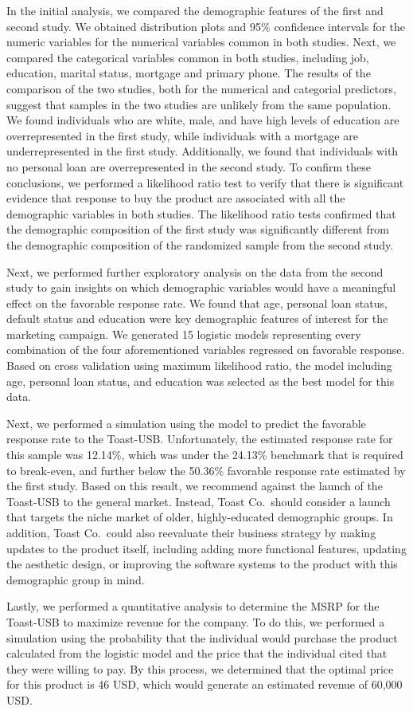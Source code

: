 \documentclass[]{article}
\begin{document}
In the initial analysis, we compared the demographic features of the
first and second study. We obtained distribution plots and 95\%
confidence intervals for the numeric variables for the numerical
variables common in both studies. Next, we compared the categorical
variables common in both studies, including job, education, marital
status, mortgage and primary phone. The results of the comparison of the
two studies, both for the numerical and categorial predictors, suggest
that samples in the two studies are unlikely from the same population.
We found individuals who are white, male, and have high levels of
education are overrepresented in the first study, while individuals with
a mortgage are underrepresented in the first study. Additionally, we
found that individuals with no personal loan are overrepresented in the
second study. To confirm these conclusions, we performed a likelihood
ratio test to verify that there is significant evidence that response to
buy the product are associated with all the demographic variables in
both studies. The likelihood ratio tests confirmed that the demographic
composition of the first study was significantly different from the
demographic composition of the randomized sample from the second study.

Next, we performed further exploratory analysis on the data from the
second study to gain insights on which demographic variables would have
a meaningful effect on the favorable response rate. We found that age,
personal loan status, default status and education were key demographic
features of interest for the marketing campaign. We generated 15
logistic models representing every combination of the four
aforementioned variables regressed on favorable response. Based on cross
validation using maximum likelihood ratio, the model including age,
personal loan status, and education was selected as the best model for
this data.

Next, we performed a simulation using the model to predict the favorable
response rate to the Toast-USB. Unfortunately, the estimated response
rate for this sample was 12.14\%, which was under the 24.13\% benchmark
that is required to break-even, and further below the 50.36\% favorable
response rate estimated by the first study. Based on this result, we
recommend against the launch of the Toast-USB to the general market.
Instead, Toast Co.~should consider a launch that targets the niche
market of older, highly-educated demographic groups. In addition, Toast
Co.~could also reevaluate their business strategy by making updates to
the product itself, including adding more functional features, updating
the aesthetic design, or improving the software systems to the product
with this demographic group in mind.

Lastly, we performed a quantitative analysis to determine the MSRP for
the Toast-USB to maximize revenue for the company. To do this, we
performed a simulation using the probability that the individual would
purchase the product calculated from the logistic model and the price
that the individual cited that they were willing to pay. By this
process, we determined that the optimal price for this product is 46
USD, which would generate an estimated revenue of 60,000 USD.
\end{document}
